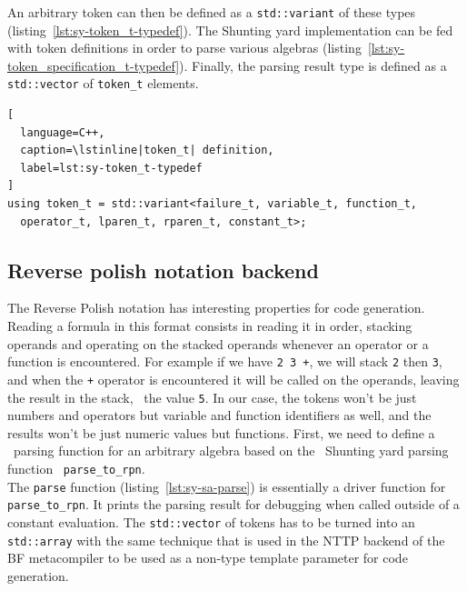 \documentclass[../../main.tex]{subfiles}
\begin{document}
An arbitrary token can then be defined as a \lstinline|std::variant| of these
types (listing~\ref{lst:sy-token_t-typedef}). The Shunting yard implementation
can be fed with token definitions in order to parse various algebras
(listing~\ref{lst:sy-token_specification_t-typedef}). Finally, the parsing result
type is defined as a \lstinline|std::vector| of \lstinline|token_t| elements.

\begin{lstlisting}[
  language=C++,
  caption=\lstinline|token_t| definition,
  label=lst:sy-token_t-typedef
]
using token_t = std::variant<failure_t, variable_t, function_t,
  operator_t, lparen_t, rparen_t, constant_t>;
\end{lstlisting}



\subsection{Reverse polish notation backend}

The Reverse Polish notation has interesting properties for code generation.
Reading a formula in this format consists in reading it in order, stacking
operands and operating on the stacked operands whenever an operator or a
function is encountered. For example if we have \lstinline|2 3 +|, we will stack
\lstinline|2| then \lstinline|3|, and when the \lstinline|+| operator is
encountered it will be called on the operands, leaving the result in the stack,
\ie~the value \lstinline|5|.
In our case, the tokens won't be just numbers and operators but variable and
function identifiers as well, and the results won't be just numeric values but
functions. First, we need to define a \constexpr~parsing function for an
arbitrary algebra based on the \constexpr~Shunting yard parsing function
\ie~\lstinline|parse_to_rpn|.\\

The \lstinline|parse| function (listing~\ref{lst:sy-sa-parse}) is
essentially a driver function for \lstinline|parse_to_rpn|. It prints the
parsing result for debugging when called outside of a constant evaluation.
The \lstinline|std::vector| of tokens has to be turned into an
\lstinline|std::array| with the same technique that is used in the NTTP backend
of the BF metacompiler to be used as a non-type template parameter for code
generation.\\
\end{document}
